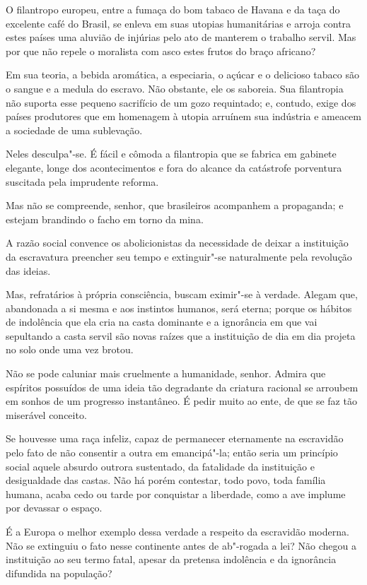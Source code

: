  O filantropo europeu, entre a fumaça do bom tabaco de Havana e da taça
do excelente café do Brasil, se enleva em suas utopias humanitárias e
arroja contra estes países uma aluvião de injúrias pelo ato de manterem
o trabalho servil. Mas por que não repele o moralista com asco estes
frutos do braço africano?

Em sua teoria, a bebida aromática, a especiaria, o açúcar e o delicioso
tabaco são o sangue e a medula do escravo. Não obstante, ele os
saboreia. Sua filantropia não suporta esse pequeno sacrifício de um
gozo requintado; e, contudo, exige dos países produtores que em
homenagem à utopia arruínem sua indústria e ameacem a sociedade de uma sublevação.

Neles desculpa"-se. É fácil e cômoda a filantropia que se fabrica em
gabinete elegante, longe dos acontecimentos e fora do alcance da
catástrofe porventura suscitada pela imprudente reforma.

Mas não se compreende, senhor, que brasileiros acompanhem a propaganda;
e estejam brandindo o facho em torno da mina.

\sectionitem

A razão social convence os abolicionistas da necessidade de deixar a
instituição da escravatura preencher seu tempo e extinguir"-se
naturalmente pela revolução das ideias.

Mas, refratários à própria consciência, buscam eximir"-se à verdade.
Alegam que, abandonada a si mesma e aos instintos humanos, será eterna;
porque os hábitos de indolência que ela cria na casta dominante e a
ignorância em que vai sepultando a casta servil são novas raízes que a
instituição de dia em dia projeta no solo onde uma vez brotou.

Não se pode caluniar mais cruelmente a humanidade, senhor. Admira que
espíritos possuídos de uma ideia tão degradante da criatura racional se
arroubem em sonhos de um progresso instantâneo. É pedir muito ao ente,
de que se faz tão miserável conceito.

Se houvesse uma raça infeliz, capaz de permanecer eternamente na
escravidão pelo fato de não consentir a outra em emancipá"-la; então
seria um princípio social aquele absurdo outrora sustentado, da
fatalidade da instituição e desigualdade das castas. Não há porém
contestar, todo povo, toda família humana, acaba cedo ou tarde por
conquistar a liberdade, como a ave implume por devassar o espaço. \label{implume}

É a Europa o melhor exemplo dessa verdade a respeito da escravidão
moderna. Não se extinguiu o fato nesse continente antes de ab"-rogada
a lei? Não chegou a instituição ao seu termo fatal, apesar da pretensa
indolência e da ignorância difundida na população?

